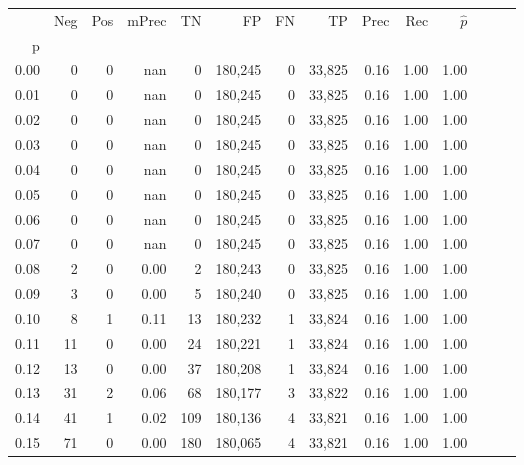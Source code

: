 \begin{tabular}{rrrrrrrrrrrrrr}
\toprule
{} &    Neg &    Pos & mPrec &       TN &       FP &      FN &      TP &  Prec &   Rec & $\hat{p}$ \\
p    &        &        &       &          &          &         &         &       &       &           \\
\midrule
0.00 &      0 &      0 &   nan &        0 &  180,245 &       0 &  33,825 &  0.16 &  1.00 &      1.00 \\
0.01 &      0 &      0 &   nan &        0 &  180,245 &       0 &  33,825 &  0.16 &  1.00 &      1.00 \\
0.02 &      0 &      0 &   nan &        0 &  180,245 &       0 &  33,825 &  0.16 &  1.00 &      1.00 \\
0.03 &      0 &      0 &   nan &        0 &  180,245 &       0 &  33,825 &  0.16 &  1.00 &      1.00 \\
0.04 &      0 &      0 &   nan &        0 &  180,245 &       0 &  33,825 &  0.16 &  1.00 &      1.00 \\
0.05 &      0 &      0 &   nan &        0 &  180,245 &       0 &  33,825 &  0.16 &  1.00 &      1.00 \\
0.06 &      0 &      0 &   nan &        0 &  180,245 &       0 &  33,825 &  0.16 &  1.00 &      1.00 \\
0.07 &      0 &      0 &   nan &        0 &  180,245 &       0 &  33,825 &  0.16 &  1.00 &      1.00 \\
0.08 &      2 &      0 &  0.00 &        2 &  180,243 &       0 &  33,825 &  0.16 &  1.00 &      1.00 \\
0.09 &      3 &      0 &  0.00 &        5 &  180,240 &       0 &  33,825 &  0.16 &  1.00 &      1.00 \\
0.10 &      8 &      1 &  0.11 &       13 &  180,232 &       1 &  33,824 &  0.16 &  1.00 &      1.00 \\
0.11 &     11 &      0 &  0.00 &       24 &  180,221 &       1 &  33,824 &  0.16 &  1.00 &      1.00 \\
0.12 &     13 &      0 &  0.00 &       37 &  180,208 &       1 &  33,824 &  0.16 &  1.00 &      1.00 \\
0.13 &     31 &      2 &  0.06 &       68 &  180,177 &       3 &  33,822 &  0.16 &  1.00 &      1.00 \\
0.14 &     41 &      1 &  0.02 &      109 &  180,136 &       4 &  33,821 &  0.16 &  1.00 &      1.00 \\
0.15 &     71 &      0 &  0.00 &      180 &  180,065 &       4 &  33,821 &  0.16 &  1.00 &      1.00 \\

\end{tabular}
